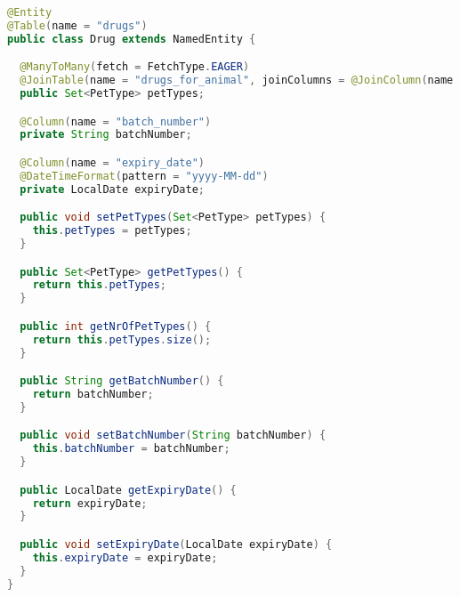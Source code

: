 \documentclass[12pt, a4paper]{article}
\begin{document}
\begin{lstlisting}[language=Java, title='Drug.java']
@Entity
@Table(name = "drugs")
public class Drug extends NamedEntity {

  @ManyToMany(fetch = FetchType.EAGER)
  @JoinTable(name = "drugs_for_animal", joinColumns = @JoinColumn(name = "drug_id"), inverseJoinColumns = @JoinColumn(name = "animal_type_id"))
  public Set<PetType> petTypes;

  @Column(name = "batch_number")
  private String batchNumber;

  @Column(name = "expiry_date")
  @DateTimeFormat(pattern = "yyyy-MM-dd")
  private LocalDate expiryDate;

  public void setPetTypes(Set<PetType> petTypes) {
    this.petTypes = petTypes;
  }

  public Set<PetType> getPetTypes() {
    return this.petTypes;
  }

  public int getNrOfPetTypes() {
    return this.petTypes.size();
  }

  public String getBatchNumber() {
    return batchNumber;
  }

  public void setBatchNumber(String batchNumber) {
    this.batchNumber = batchNumber;
  }

  public LocalDate getExpiryDate() {
    return expiryDate;
  }

  public void setExpiryDate(LocalDate expiryDate) {
    this.expiryDate = expiryDate;
  }
}
\end{lstlisting}
\end{document}

